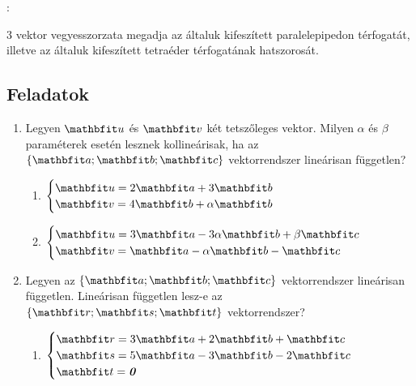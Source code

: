 \documentclass[a4paper, 12pt]{scrartcl}
\begin{document}
\begin{note}
  :

  3 vektor vegyesszorzata megadja az általuk kifeszített paralelepipedon
  térfogatát, illetve az általuk kifeszített tetraéder térfogatának hatszorosát.
\end{note}

\clearpage
\subsection{Feladatok}

\begin{enumerate}
  \item Legyen $\rvec u$ és $\rvec v$ két tetszőleges vektor. Milyen $\alpha$ és
        $\beta$ paraméterek esetén lesznek kollineárisak, ha az $\{ \rvec a;
          \rvec b; \rvec c \}$ vektorrendszer lineárisan független?
        \begin{multicols}{2}
          \begin{enumerate}
            \item $
                    \begin{cases}
                      \rvec u = 2 \rvec a + 3 \rvec b \\
                      \rvec v = 4 \rvec b + \alpha \rvec b
                    \end{cases}
                  $

            \item $
                    \begin{cases}
                      \rvec u = 3 \rvec a - 3 \alpha \rvec b + \beta \rvec c \\
                      \rvec v = \rvec a - \alpha \rvec b - \rvec c
                    \end{cases}
                  $
          \end{enumerate}
        \end{multicols}

  \item Legyen az $\{ \rvec a; \rvec b; \rvec c \}$ vektorrendszer lineárisan
        független. Lineárisan független lesz-e az $\{ \rvec r; \rvec s;
          \rvec t \}$ vektorrendszer?
        \begin{multicols}{2}
          \begin{enumerate}
            \item $
                    \begin{cases}
                      \rvec r = 3 \rvec a + 2 \rvec b +   \rvec c \\
                      \rvec s = 5 \rvec a - 3 \rvec b - 2 \rvec c \\
                      \rvec t = \nvec
                    \end{cases}
                  $


\end{enumerate}
\end{multicols}
\end{enumerate}
\end{document}
